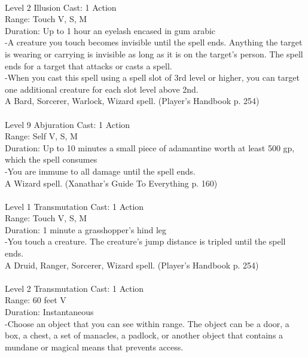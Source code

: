 \documentclass[10pt,twocolumn]{report}
\begin{document}
 \\
Level 2 \quad Illusion \quad Cast: 1 Action\\
Range: Touch \quad V, S, M\\
Duration: Up to 1 hour \quad an eyelash encased in gum arabic\\
-A creature you touch becomes invisible until the spell ends. Anything the target is wearing or carrying is invisible as long as it is on the target’s person. The spell ends for a target that attacks or casts a spell.\\
-When you cast this spell using a spell slot of 3rd level or higher, you can target one additional creature for each slot level above 2nd.\\
A Bard, Sorcerer, Warlock, Wizard spell. (Player's Handbook p. 254) \\


 \\
Level 9 \quad Abjuration \quad Cast: 1 Action\\
Range: Self \quad V, S, M\\
Duration: Up to 10 minutes \quad a small piece of adamantine worth at least 500 gp, which the spell consumes\\
-You are immune to all damage until the spell ends.\\
A Wizard spell. (Xanathar's Guide To Everything p. 160) \\


 \\
Level 1 \quad Transmutation \quad Cast: 1 Action\\
Range: Touch \quad V, S, M\\
Duration: 1 minute \quad a grasshopper’s hind leg\\
-You touch a creature. The creature’s jump distance is tripled until the spell ends.\\
A Druid, Ranger, Sorcerer, Wizard spell. (Player's Handbook p. 254) \\


 \\
Level 2 \quad Transmutation \quad Cast: 1 Action\\
Range: 60 feet \quad V\\
Duration: Instantaneous \quad \\
-Choose an object that you can see within range. The object can be a door, a box, a chest, a set of manacles, a padlock, or another object that contains a mundane or magical means that prevents access.
\end{document}
